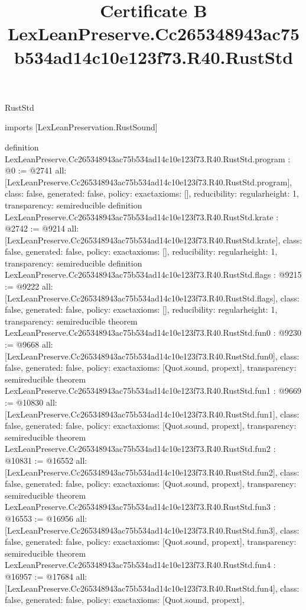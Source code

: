 \begin{lexlean}{RustStd}
\title{Certificate B LexLeanPreserve.Cc265348943ac75b534ad14c10e123f73.R40.RustStd}
\begin{coremodule}
imports [LexLeanPreservation.RustSound]

definition LexLeanPreserve.Cc265348943ac75b534ad14c10e123f73.R40.RustStd.program : @0 := @2741 {
  all: [LexLeanPreserve.Cc265348943ac75b534ad14c10e123f73.R40.RustStd.program],
  class: false,
  generated: false,
  policy: exact{axioms: []},
  reducibility: regular{height: 1},
  transparency: semireducible
}
definition LexLeanPreserve.Cc265348943ac75b534ad14c10e123f73.R40.RustStd.krate : @2742 := @9214 {
  all: [LexLeanPreserve.Cc265348943ac75b534ad14c10e123f73.R40.RustStd.krate],
  class: false,
  generated: false,
  policy: exact{axioms: []},
  reducibility: regular{height: 1},
  transparency: semireducible
}
definition LexLeanPreserve.Cc265348943ac75b534ad14c10e123f73.R40.RustStd.flags : @9215 := @9222 {
  all: [LexLeanPreserve.Cc265348943ac75b534ad14c10e123f73.R40.RustStd.flags],
  class: false,
  generated: false,
  policy: exact{axioms: []},
  reducibility: regular{height: 1},
  transparency: semireducible
}
theorem LexLeanPreserve.Cc265348943ac75b534ad14c10e123f73.R40.RustStd.fun0 : @9230 := @9668 {
  all: [LexLeanPreserve.Cc265348943ac75b534ad14c10e123f73.R40.RustStd.fun0],
  class: false,
  generated: false,
  policy: exact{axioms: [Quot.sound, propext]},
  transparency: semireducible
}
theorem LexLeanPreserve.Cc265348943ac75b534ad14c10e123f73.R40.RustStd.fun1 : @9669 := @10830 {
  all: [LexLeanPreserve.Cc265348943ac75b534ad14c10e123f73.R40.RustStd.fun1],
  class: false,
  generated: false,
  policy: exact{axioms: [Quot.sound, propext]},
  transparency: semireducible
}
theorem LexLeanPreserve.Cc265348943ac75b534ad14c10e123f73.R40.RustStd.fun2 : @10831 := @16552 {
  all: [LexLeanPreserve.Cc265348943ac75b534ad14c10e123f73.R40.RustStd.fun2],
  class: false,
  generated: false,
  policy: exact{axioms: [Quot.sound, propext]},
  transparency: semireducible
}
theorem LexLeanPreserve.Cc265348943ac75b534ad14c10e123f73.R40.RustStd.fun3 : @16553 := @16956 {
  all: [LexLeanPreserve.Cc265348943ac75b534ad14c10e123f73.R40.RustStd.fun3],
  class: false,
  generated: false,
  policy: exact{axioms: [Quot.sound, propext]},
  transparency: semireducible
}
theorem LexLeanPreserve.Cc265348943ac75b534ad14c10e123f73.R40.RustStd.fun4 : @16957 := @17684 {
  all: [LexLeanPreserve.Cc265348943ac75b534ad14c10e123f73.R40.RustStd.fun4],
  class: false,
  generated: false,
  policy: exact{axioms: [Quot.sound, propext]},
}
\end{coremodule}
\end{lexlean}
